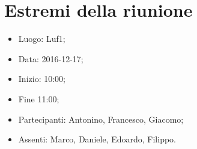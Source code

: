 \documentclass[../verbale-2016-12-17.tex]{subfiles}
\begin{document}
\section{Estremi della riunione}
	\begin{itemize}
		\item Luogo: Luf1;
		\item Data: 2016-12-17;
      \item Inizio: 10:00;
      \item Fine 11:00;
		\item Partecipanti: Antonino, Francesco, Giacomo;
      \item Assenti: Marco, Daniele, Edoardo, Filippo.
	\end{itemize}
\end{document}
